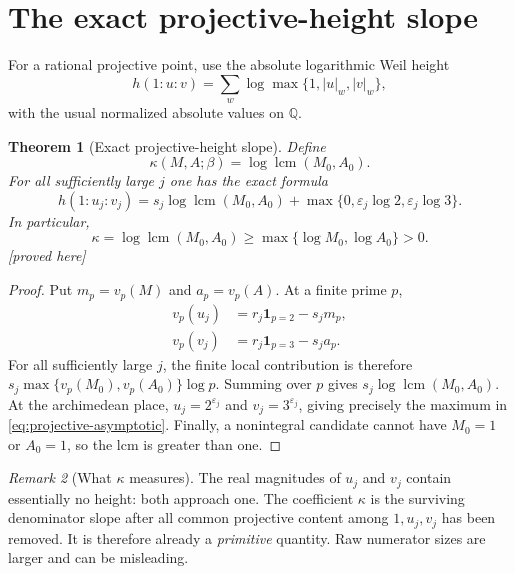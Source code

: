 \documentclass[11pt,oneside]{article}
\newtheorem{theorem}{Theorem}[section]
\theoremstyle{definition}
\theoremstyle{remark}
\newtheorem{remark}[theorem]{Remark}
\newcommand{\Q}{\mathbb Q}
\newcommand{\eps}{\varepsilon}
\newcommand{\proved}{\textcolor{deepgreen}{\textsf{[proved here]}}}
\begin{document}
\section{The exact projective-height slope}
\label{sec:kappa}

For a rational projective point, use the absolute logarithmic Weil height
\[
 h(1:u:v)=\sum_{w}\log\max\{1,|u|_w,|v|_w\},
\]
with the usual normalized absolute values on $\Q$.

\begin{theorem}[Exact projective-height slope]
\label{thm:kappa}
Define
\begin{equation}
 \boxed{
 \kappa(M,A;\beta)=\log\operatorname{lcm}(M_0,A_0).}
 \label{eq:kappa}
\end{equation}
For all sufficiently large $j$ one has the exact formula
\begin{equation}
 h(1:u_j:v_j)=s_j\log\operatorname{lcm}(M_0,A_0)
 +\max\{0,\eps_j\log2,\eps_j\log3\}.
 \label{eq:projective-asymptotic}
\end{equation}
In particular,
\begin{equation}
 \kappa=\log\operatorname{lcm}(M_0,A_0)
 \ge\max\{\log M_0,\log A_0\}>0.
 \label{eq:kappa-positive}
\end{equation}
\proved
\end{theorem}

\begin{proof}
Put $m_p=v_p(M)$ and $a_p=v_p(A)$.  At a finite prime $p$,
\begin{align*}
 v_p(u_j)&=r_j\mathbf1_{p=2}-s_jm_p,\\
 v_p(v_j)&=r_j\mathbf1_{p=3}-s_ja_p.
\end{align*}
For all sufficiently large $j$, the finite local contribution is therefore
$s_j\max\{v_p(M_0),v_p(A_0)\}\log p$.  Summing over $p$ gives
$s_j\log\operatorname{lcm}(M_0,A_0)$.  At the archimedean place,
$u_j=2^{\eps_j}$ and $v_j=3^{\eps_j}$, giving precisely the maximum in
\eqref{eq:projective-asymptotic}.  Finally, a nonintegral candidate cannot have
$M_0=1$ or $A_0=1$, so the lcm is greater than one.
\end{proof}

\begin{remark}[What $\kappa$ measures]
The real magnitudes of $u_j$ and $v_j$ contain essentially no height: both approach one.
The coefficient $\kappa$ is the surviving denominator slope after all common projective
content among $1,u_j,v_j$ has been removed.  It is therefore already a \emph{primitive}
quantity.  Raw numerator sizes are larger and can be misleading.
\end{remark}
\end{document}
